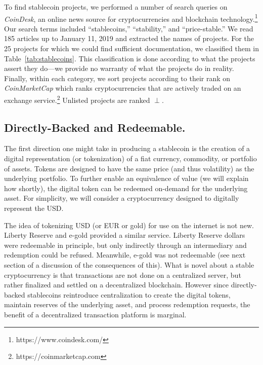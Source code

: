 To find stablecoin projects, we performed a number of search queries on \textit{CoinDesk}, an online news source for cryptocurrencies and blockchain technology.\footnote{https://www.coindesk.com/} Our search terms included ``stablecoins,'' ``stability,'' and ``price-stable.'' We read 185 articles up to January 11, 2019 and extracted the names of projects. For the 25 projects for which we could find sufficient documentation, we classified them in Table~\ref{tab:stablecoins}. This classification is done according to what the projects assert they do---we provide no warranty of what the projects do in reality. Finally, within each category, we sort projects according to their rank on \textit{CoinMarketCap} which ranks cryptocurrencies that are actively traded on an exchange service.\footnote{https://coinmarketcap.com} Unlisted projects are ranked $\perp$.

\subsection{Directly-Backed and Redeemable.}

The first direction one might take in producing a stablecoin is the creation of a digital representation (or tokenization) of a fiat currency, commodity, or portfolio of assets. Tokens are designed to have the same price (and thus volatility) as the underlying portfolio. To further enable an equivalence of value (we will explain how shortly), the digital token can be redeemed on-demand for the underlying asset. For simplicity, we will consider a cryptocurrency designed to digitally represent the USD. 

The idea of tokenizing USD (or EUR or gold) for use on the internet is not new. Liberty Reserve and e-gold provided a similar service. Liberty Reserve dollars were redeemable in principle, but only indirectly through an intermediary and redemption could be refused. Meanwhile, e-gold was not redeemable (see next section of a discussion of the consequences of this). What is novel about a stable cryptocurrency is that transactions are not done on a centralized server, but rather finalized and settled on a decentralized blockchain. However since directly-backed stablecoins reintroduce centralization to create the digital tokens, maintain reserves of the underlying asset, and process redemption requests, the benefit of a decentralized transaction platform is marginal.

